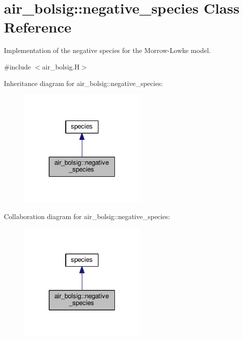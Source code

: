 \hypertarget{classair__bolsig_1_1negative__species}{}\section{air\+\_\+bolsig\+:\+:negative\+\_\+species Class Reference}
\label{classair__bolsig_1_1negative__species}


Implementation of the negative species for the Morrow-\/\+Lowke model.  




{\ttfamily \#include $<$air\+\_\+bolsig.\+H$>$}



Inheritance diagram for air\+\_\+bolsig\+:\+:negative\+\_\+species\+:\nopagebreak
\begin{figure}[H]
\begin{center}
\leavevmode
\includegraphics[width=181pt]{classair__bolsig_1_1negative__species__inherit__graph}
\end{center}
\end{figure}


Collaboration diagram for air\+\_\+bolsig\+:\+:negative\+\_\+species\+:\nopagebreak
\begin{figure}[H]
\begin{center}
\leavevmode
\includegraphics[width=181pt]{classair__bolsig_1_1negative__species__coll__graph}
\end{center}
\end{figure}
